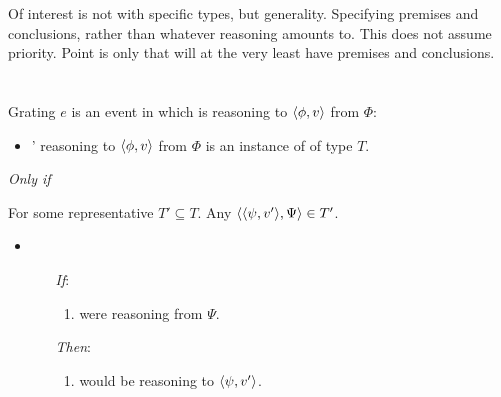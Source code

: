\begin{note}
  Of interest is not with specific types, but generality.
  Specifying premises and conclusions, rather than whatever reasoning amounts to.
  This does not assume priority.
  Point is only that will at the very least have premises and conclusions.
\end{note}


\section{}
\label{sec:sr2-1}

\begin{note}
  \begin{definition}[\sR{2}]
    \label{def:cmptnc}

    Grating \(e\) is an event in which \vAgent{} is reasoning to \(\langle \phi, v \rangle\) from \(\Phi\):

    \begin{itemize}
    \item
      \vAgent{}' reasoning to \(\langle \phi, v \rangle\) from \(\Phi\) is an instance of \emph{} of type \(T\).
    \end{itemize}

    \emph{Only if}

    For some representative \(T' \subseteq T\).
    Any \(\langle \langle \psi, v' \rangle, \Psi \rangle \in T'\).

    \begin{itemize}
    \item
      \begin{itemize}
      \item[\emph{If}:]
        \begin{enumerate}[label=\alph*., ref=(\alph*)]
        \item
          \vAgent{} were reasoning from \(\Psi\).
        \end{enumerate}
      \item[\emph{Then}:]
        \begin{enumerate}[label=\alph*., ref=(\alph*), resume]
        \item
          \vAgent{} would be reasoning to \(\langle \psi, v' \rangle\).
        \end{enumerate}
      \end{itemize}
    \end{itemize}


\end{definition}
\end{note}
